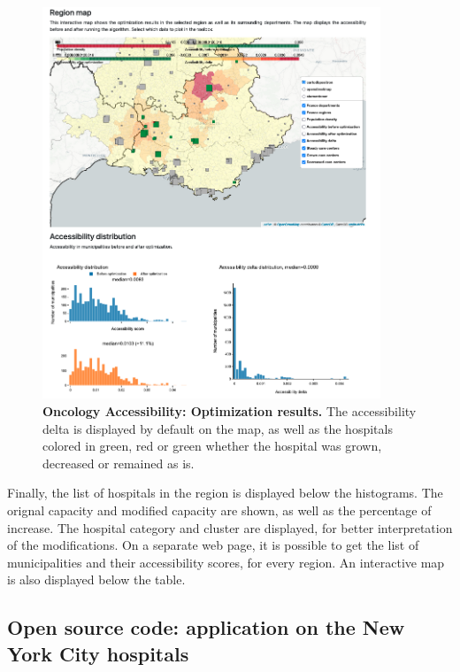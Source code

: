 \begin{figure}[h!]
    \includegraphics[width=0.9\textwidth]{images/oncology-accessibility/optim-paca-map.png}
    \centering
    \caption{ \textbf{Oncology Accessibility: Optimization results.}  The
        accessibility delta is displayed by default on the map, as well as the
        hospitals colored in green, red or green whether the hospital was grown,
        decreased or remained as is. }
    \label{fig:optim-results}
\end{figure}

Finally, the list of hospitals in the region is displayed below the histograms.
The orignal capacity and modified capacity are shown, as well as the percentage
of increase. The hospital category and cluster are displayed, for better
interpretation of the modifications. On a separate web page, it is possible to
get the list of municipalities and their accessibility scores, for every region.
An interactive map is also displayed below the table.

\subsection{Open source code: application on the New York City hospitals}

